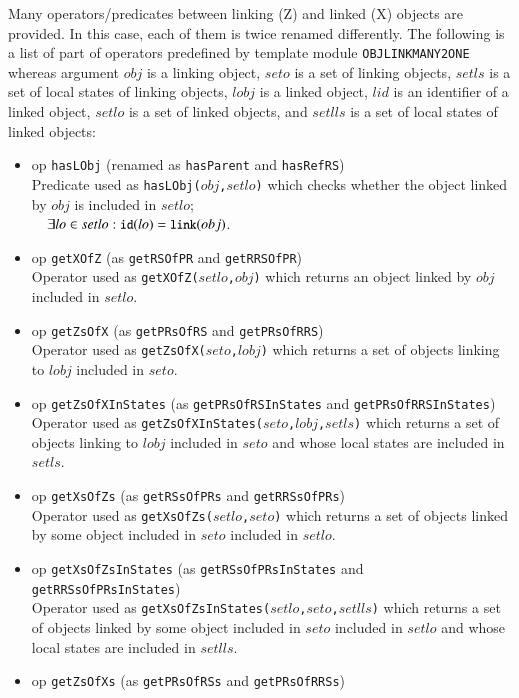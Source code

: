 \documentclass[12pt]{report}
\newcommand{\mbstt}[1]{\mbox{\small{\tt {#1}}}}
\newcommand{\stt}[1]{{\small{\tt {#1}}}}
\begin{document}
Many operators/predicates between linking (Z) and linked (X) objects
are provided. In this case, each of them is twice renamed differently.
The following is a list of part of operators predefined by template
module {\tt OBJLINKMANY2ONE} whereas argument $obj$ is a linking
object, $seto$ is a set of linking objects, $setls$ is a set of local
states of linking objects, $lobj$ is a linked object, $lid$ is an
identifier of a linked object, $setlo$ is a set of linked objects, and
$setlls$ is a set of local states of linked objects:
\begin{itemize}
\item op \stt{hasLObj} (renamed as \stt{hasParent} and \stt{hasRefRS})\\
  Predicate used as \stt{hasLObj($obj$,$setlo$)} which checks whether
  the object linked by $obj$ is included in $setlo$;\\$~~~~\exists lo\in
  setlo:\mbstt{id}(lo)=\mbstt{link}(obj)$.
\item op \stt{getXOfZ} (as \stt{getRSOfPR} and \stt{getRRSOfPR})\\
  Operator used as \stt{getXOfZ($setlo$,$obj$)} which returns an
  object linked by $obj$ included in $setlo$.
\item op \stt{getZsOfX} (as \stt{getPRsOfRS} and \stt{getPRsOfRRS})\\
  Operator used as \stt{getZsOfX($seto$,$lobj$)} which returns a set
  of objects linking to $lobj$ included in $seto$.
\item op \stt{getZsOfXInStates} (as \stt{getPRsOfRSInStates} and \stt{getPRsOfRRSInStates})\\
  Operator used as \stt{getZsOfXInStates($seto$,$lobj$,$setls$)} which
  returns a set of objects linking to $lobj$ included in $seto$ and
  whose local states are included in $setls$.
\item op \stt{getXsOfZs} (as \stt{getRSsOfPRs} and \stt{getRRSsOfPRs})\\
  Operator used as \stt{getXsOfZs($setlo$,$seto$)} which returns a set
  of objects linked by some object included in $seto$ included in
  $setlo$.
\item op \stt{getXsOfZsInStates} (as \stt{getRSsOfPRsInStates} and \stt{getRRSsOfPRsInStates})\\
  Operator used as \stt{getXsOfZsInStates($setlo$,$seto$,$setlls$)}
  which returns a set of objects linked by some object included in
  $seto$ included in $setlo$ and whose local states are included in
  $setlls$.
\item op \stt{getZsOfXs} (as \stt{getPRsOfRSs} and \stt{getPRsOfRRSs})\\

\end{itemize}
\end{document}

